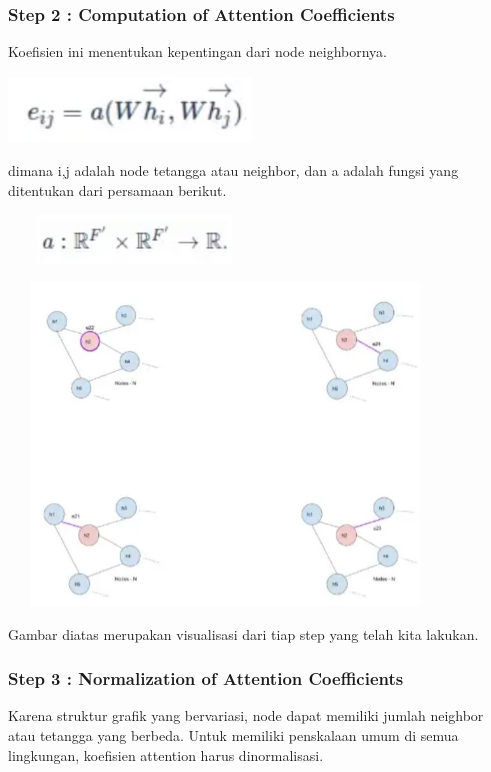 \documentclass{article}
\begin{document}
\subsubsection{Step 2 : Computation of Attention Coefficients}
Koefisien ini menentukan kepentingan dari node neighbornya. 

\begin{center}
\includegraphics[width=2.54167in,height=0.69792in]{Picture/Fig2.jpg}    
\end{center}

dimana i,j adalah node tetangga atau neighbor, dan a adalah fungsi yang ditentukan dari persamaan berikut.

\begin{center}
\includegraphics[width=2.63542in,height=0.51042in]{Picture/Fig3.jpg}
\end{center}

\begin{center}
\includegraphics[width=4.52604in,height=3.37318in]{Picture/Fig4.jpg}
\end{center}

Gambar diatas merupakan visualisasi dari tiap step yang telah kita lakukan.

\subsubsection{Step 3 : Normalization of Attention Coefficients}
Karena struktur grafik yang bervariasi, node dapat memiliki jumlah neighbor atau tetangga yang berbeda. Untuk memiliki penskalaan umum di semua lingkungan, koefisien attention harus dinormalisasi.
\end{document}
